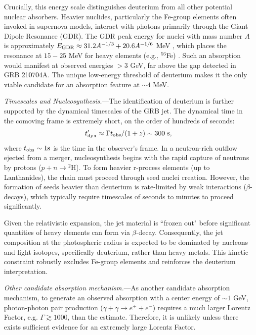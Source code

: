 \documentclass[linenumbers,twocolumn]{aastex631}
\begin{document}
Crucially, this energy scale distinguishes deuterium from all other potential nuclear absorbers. Heavier nuclides, particularly the Fe-group elements often invoked in supernova models, interact with photons primarily through the Giant Dipole Resonance (GDR). The GDR peak energy for nuclei with mass number $A$ is approximately $E_{\rm GDR} \approx 31.2 A^{-1/3} + 20.6 A^{-1/6}$ MeV \citep{1975RvMP...47..713B}, which places the resonance at $15-25$ MeV for heavy elements (e.g., $^{56}$Fe) \citep{2020NuDS..163..109K}. Such an absorption would manifest at observed energies $>3$ GeV, far above the gap detected in GRB 210704A. The unique low-energy threshold of deuterium makes it the only viable candidate for an absorption feature at $\sim 4$ MeV.

\textit{Timescales and Nucleosynthesis.}---The identification of deuterium is further supported by the dynamical timescales of the GRB jet. %
The dynamical time in the comoving frame is extremely short, on the order of hundreds of seconds:
\begin{equation}
t'_{\rm dyn} \approx \Gamma t_{\rm obs}/(1+z) \sim 300 \text{ s},
\end{equation}
where $t_{\rm obs} \sim 1 \text{s}$ is the time in the observer's frame.
In a neutron-rich outflow ejected from a merger, nucleosynthesis begins with the rapid capture of neutrons by protons ($p + n \rightarrow {^2\text{H}}$). To form heavier r-process elements (up to Lanthanides), the chain must proceed through seed nuclei creation. However, the formation of seeds heavier than deuterium is rate-limited by weak interactions ($\beta$-decays), which typically require timescales of seconds to minutes to proceed significantly.

Given the relativistic expansion, the jet material is ``frozen out" before significant quantities of heavy elements can form via $\beta$-decay. Consequently, the jet composition at the photospheric radius is expected to be dominated by nucleons and light isotopes, specifically deuterium, rather than heavy metals. This kinetic constraint robustly excludes Fe-group elements and reinforces the deuterium interpretation.



\textit{Other candidate absorption mechanism.}---As another candidate absorption mechanism, to generate an observed absorption with a center energy of $\sim1$ GeV, photon-photon pair production ($\gamma+\gamma \to 
e^+ + e^-$) requires a much larger Lorentz Factor, e.g. $\Gamma\gtrsim 1000$, than the estimate. Therefore, it is unlikely unless there exists sufficient evidence for an extremely large Lorentz Factor. 
\end{document}
